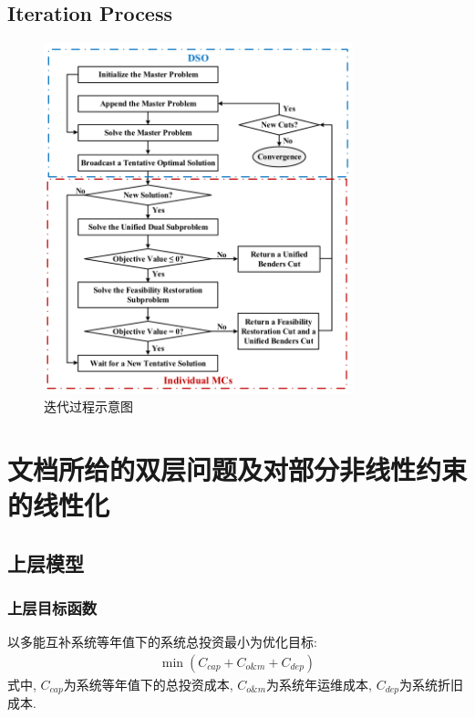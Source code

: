 \documentclass{article}
\begin{document}
\subsection{Iteration Process}
\begin{figure}[htbp]
    \centering
    \includegraphics[width=0.8\textwidth]{./pic/IterationProcess.png}
    \caption{迭代过程示意图}
    \label{fig:iteration_process}
\end{figure}


\clearpage
\setcounter{page}{1}
\setcounter{section}{0}

\section{文档所给的双层问题及对部分非线性约束的线性化}
\subsection{上层模型}
\subsubsection{上层目标函数}
以多能互补系统等年值下的系统总投资最小为优化目标:
\setcounter{equation}{0}
\begin{align}
    \min\left(C_{cap}+C_{o\&m}+C_{dep}\right)
\end{align}
式中, $C_{cap}$为系统等年值下的总投资成本, $C_{o\&m}$为系统年运维成本, $C_{dep}$为系统折旧成本.
\end{document}
